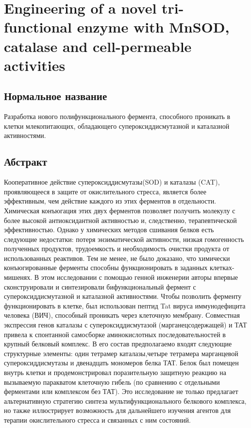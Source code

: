\section{Engineering of a novel tri-functional enzyme with MnSOD, catalase 	and cell-permeable activities}

\subsection{Нормальное название}

Разработка нового полифункционального фермента, способного проникать в клетки млекопитающих, обладающего супероксиддисмутазной и каталазной активностями.

\subsection{Абстракт}

Кооперативное действие супероксиддисмутазы(SOD) и каталазы (CAT), проявляющееся в защите от окислительного стресса, является более эффективным, чем действие каждого из этих ферментов в отдельности. Химическая конъюгация этих двух ферментов позволяет получить молекулу с более высокой антиоксидантной активностью и, следственно, терапевтической эффективностью. Однако у химических методов сшивания белков есть следующие недостатки: потеря энзиматической активности, низкая гомогенность полученных продуктов, трудоемкость и необходимость очистки продукта от использованных реактивов. Тем не менее, не было доказано, что химически конъюгированные ферменты способны функционировать в заданных клетках-мишенях. В этом исследовании с помощью генной инженерии авторы впервые сконструировали и синтезировали бифункциональный фермент с супероксиддисмутазной и каталазной активностями. Чтобы позволить ферменту функционировать в клетке, был использован пептид Tat вируса иммунодефицита человека (ВИЧ), способный проникать через клеточную мембрану. Совместная экспрессия генов каталазы с супероксиддисмутазой (марганецсодержащей) и ТАТ привела к спонтанной самосборке аминокислотных последовательностей в крупный белковый комплекс. В его состав предполагаемо входят следующие структурные элементы: один тетрамер каталазы,четыре тетрамера марганцевой супероксиддисмутазы и двенадцать мономеров белка ТАТ. Белок был помещен внутрь клетки и продемонстрировал поразительную защитную реакцию на вызываемую паракватом клеточную гибель (по сравнению с отдельными ферментами или комплексом без ТАТ). Это исследование не только предлагает альтернативную стратегию синтеза мультифункционального белкового комплекса, но также иллюстрирует возможность для дальнейшего изучения агентов для терапии окислительного стресса и связанных с ним состояний.

